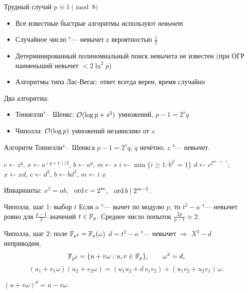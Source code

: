 \documentclass{ca-slides}
\begin{document}
\begin{canvasframe}{Трудный случай $p \equiv 1 \pmod 8$}
  \begin{itemize}
    \item Все известные быстрые алгоритмы используют \emph{невычет}
    \item Случайное число "--- невычет с вероятностью $\frac12$
    \item Детерминированный полиномиальный поиск невычета не известен
      (при ОГР наименьший невычет $< 2\ln^2 p$)
    \item Алгоритмы типа Лас-Вегас: ответ всегда верен, время случайно
  \end{itemize}
  \bigskip
  Два алгоритма:
  \begin{itemize}
    \item Тоннелли"--~Шенкс: $\mathcal{O}(\log p + s^2)$ умножений, $p - 1 = 2^s q$
    \item Чиполла: $\mathcal{O}(\log p)$ умножений независимо от $s$
  \end{itemize}
\end{canvasframe}

\begin{canvasframe}{Алгоритм Тоннелли"--~Шенкса}
  \small
  $p - 1 = 2^s q$, $q$ нечётно; $z$ "--- невычет.
  \begin{algorithmic}[1]
    \State $c \gets z^q$, $x \gets a^{(q+1)/2}$, $b \gets a^q$, $m \gets s$
      \State $i \gets \min\{i \ge 1 : b^{2^i} = 1\}$
      \State $d \gets c^{2^{m-i-1}}$; \ $x \gets xd$, $c \gets d^2$, $b \gets bd^2$, $m \gets i$
    \EndWhile
    \State \Return $x$
  \end{algorithmic}
  Инварианты: $x^2 = ab$, \ $\operatorname{ord} c = 2^m$, \ $\operatorname{ord} b \mid 2^{m-1}$.
  \penspace[0.05\textheight]
\end{canvasframe}

\begin{theoremframe}[lemma]{Чиполла, шаг 1: выбор $t$}
  Если $a$ "--- вычет по модулю $p$, то $t^2 - a$ "--- невычет ровно для $\frac{p-1}{2}$
  значений $t \in \mathbb{F}_{p}$. Среднее число попыток $\frac{2p}{p-1} \approx 2$.
\end{theoremframe}

\begin{canvasframe}{Чиполла, шаг 2: поле $\mathbb{F}_{p^2} = \mathbb{F}_{p}(\omega)$}
  $d = t^2 - a$ "--- невычет $\Rightarrow$ $X^2 - d$ неприводим,
  \[
    \mathbb{F}_{p^2} = \{u + v\omega : u, v \in \mathbb{F}_{p}\}, \qquad \omega^2 = d,
  \]
  \[
    (u_1 + v_1\omega)(u_2 + v_2\omega) = (u_1u_2 + d\,v_1v_2) + (u_1v_2 + u_2v_1)\,\omega.
  \]
  \begin{lemma}[Фробениус]
    $(u + v\omega)^p = u - v\omega$.
  \end{lemma}
  \proofarea[0.1\textheight]
\end{canvasframe}
\end{document}
